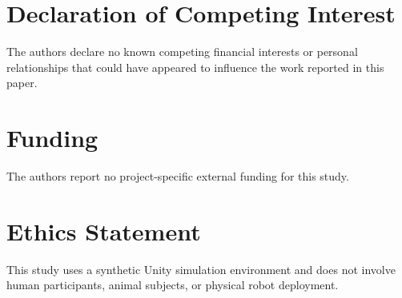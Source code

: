 \documentclass[journal]{IEEEtran}
\begin{document}
\section*{Declaration of Competing Interest}

The authors declare no known competing financial interests or personal
relationships that could have appeared to influence the work reported in this
paper.

\section*{Funding}

The authors report no project-specific external funding for this study.

\section*{Ethics Statement}

This study uses a synthetic Unity simulation environment and does not involve
human participants, animal subjects, or physical robot deployment.
\end{document}

